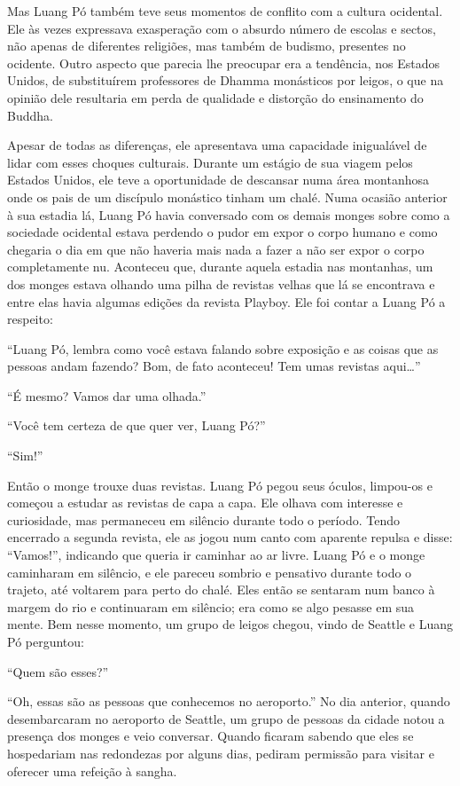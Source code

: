 Mas Luang Pó também teve seus momentos de conflito com a cultura
ocidental. Ele às vezes expressava exasperação com o absurdo número de
escolas e sectos, não apenas de diferentes religiões, mas também de
budismo, presentes no ocidente. Outro aspecto que parecia lhe preocupar
era a tendência, nos Estados Unidos, de substituírem professores de
Dhamma monásticos por leigos, o que na opinião dele resultaria em perda
de qualidade e distorção do ensinamento do Buddha.

Apesar de todas as diferenças, ele apresentava uma capacidade
inigualável de lidar com esses choques culturais. Durante um estágio de
sua viagem pelos Estados Unidos, ele teve a oportunidade de descansar
numa área montanhosa onde os pais de um discípulo monástico tinham um
chalé. Numa ocasião anterior à sua estadia lá, Luang Pó havia conversado
com os demais monges sobre como a sociedade ocidental estava perdendo o
pudor em expor o corpo humano e como chegaria o dia em que não haveria
mais nada a fazer a não ser expor o corpo completamente nu. Aconteceu
que, durante aquela estadia nas montanhas, um dos monges estava olhando
uma pilha de revistas velhas que lá se encontrava e entre elas havia
algumas edições da revista Playboy. Ele foi contar a Luang Pó a
respeito:

``Luang Pó, lembra como você estava falando sobre exposição e as coisas
que as pessoas andam fazendo? Bom, de fato aconteceu! Tem umas revistas
aqui\ldots{}''

``É mesmo? Vamos dar uma olhada.''

``Você tem certeza de que quer ver, Luang Pó?''

``Sim!''

Então o monge trouxe duas revistas. Luang Pó pegou seus óculos,
limpou-os e começou a estudar as revistas de capa a capa. Ele olhava com
interesse e curiosidade, mas permaneceu em silêncio durante todo o
período. Tendo encerrado a segunda revista, ele as jogou num canto com
aparente repulsa e disse: ``Vamos!'', indicando que queria ir caminhar
ao ar livre. Luang Pó e o monge caminharam em silêncio, e ele pareceu
sombrio e pensativo durante todo o trajeto, até voltarem para perto do
chalé. Eles então se sentaram num banco à margem do rio e continuaram em
silêncio; era como se algo pesasse em sua mente. Bem nesse momento, um
grupo de leigos chegou, vindo de Seattle e Luang Pó perguntou:

``Quem são esses?''

``Oh, essas são as pessoas que conhecemos no aeroporto.'' No dia
anterior, quando desembarcaram no aeroporto de Seattle, um grupo de
pessoas da cidade notou a presença dos monges e veio conversar. Quando
ficaram sabendo que eles se hospedariam nas redondezas por alguns dias,
pediram permissão para visitar e oferecer uma refeição à sangha.

